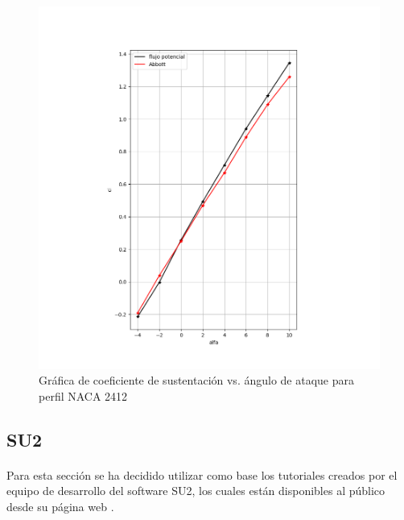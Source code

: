 \documentclass[letterpaper, openright, 12pt]{book}
\begin{document}
    \begin{figure}[H]%
        \centering
        \includegraphics[keepaspectratio,
            width=138mm]{./Imagenes/potential_flow_2412_cl}
        \caption{Gráfica de coeficiente de sustentación vs. ángulo de ataque para
            perfil NACA 2412}
        \label{fig:potential_flow_2412_cl}
    \end{figure}

    \subsection{SU2}
    \paragraph*{}
    Para esta sección se ha decidido utilizar como base los tutoriales creados
    por el equipo de desarrollo del software SU2, los cuales están disponibles
    al público desde su página web \cite{SU2}.
\end{document}
